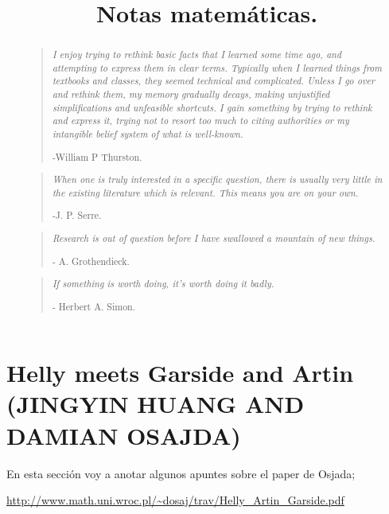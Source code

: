\documentclass[13pt]{scrartcl}
\title{\color{red!55!black} Notas matemáticas.}
\date{}
\theoremstyle{plain} %
\theoremstyle{definition}
\theoremstyle{remark}
\begin{document}
	\begin{abstract}
		\begin{quote}
			\textit{I enjoy trying to rethink basic facts that I learned some time ago, and attempting to express them in clear terms. Typically when I learned things from textbooks and classes, they seemed technical and complicated. Unless I go over and rethink them, my memory gradually decays, making unjustified simplifications and unfeasible shortcuts. I gain something by trying to rethink and express it, trying not to resort too much to citing authorities or my intangible belief system of what is well-known.}
			
			-William P Thurston.
		\end{quote}	
	
		\begin{quote}	
			\textit{When one is truly interested in a specific question, there is usually very little in the existing literature which is relevant. This means you are on your own.}
			
			-J. P. Serre.
		\end{quote}
	
		\begin{quote}
			\textit{Research is out of question before I have swallowed a mountain of new things.}
			
			- A. Grothendieck.
		\end{quote}
	
		\begin{quote}
			\textit{If something is worth doing, it's worth doing it badly.}
			
			- Herbert A. Simon.
		\end{quote}
		
	\end{abstract}
	
	\maketitle
	{\color{blue}{\tableofcontents}}

	
	\section{Helly meets Garside and Artin (JINGYIN HUANG AND DAMIAN OSAJDA)}
	
	En esta sección voy a anotar algunos apuntes sobre el paper de Osjada;
	
	\url{http://www.math.uni.wroc.pl/~dosaj/trav/Helly_Artin_Garside.pdf}
	
\end{document}
